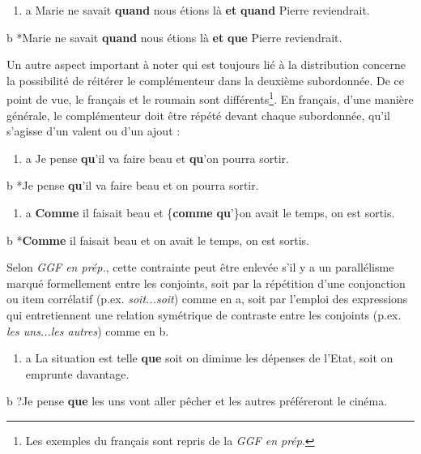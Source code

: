 \begin{enumerate}
\item \label{bkm:Ref270594898}a  Marie ne savait \textbf{quand} nous étions là \textbf{et} \textbf{quand} Pierre reviendrait.


\end{enumerate}
  b  *Marie ne savait \textbf{quand} nous étions là \textbf{et} \textbf{que} Pierre reviendrait. 

Un autre aspect important à noter qui est toujours lié à la distribution concerne la possibilité de réitérer le complémenteur dans la deuxième subordonnée. De ce point de vue, le français et le roumain sont différents\footnote{Les exemples du français sont repris de la \textit{GGF en prép}.}. En français, d'une manière générale, le complémenteur doit être répété devant chaque subordonnée, qu'il s'agisse d'un valent  ou d'un ajout  :


\begin{enumerate}
\item \label{bkm:Ref301357683}a  Je pense \textbf{qu}'il va faire beau et \textbf{qu}'on pourra sortir.


\end{enumerate}
  b  *Je pense \textbf{qu}'il va faire beau et on pourra sortir. 


\begin{enumerate}
\item \label{bkm:Ref301357699}a  \textbf{Comme} il faisait beau et \{\textbf{comme} {\textbar} \textbf{qu}'\}on avait le temps, on est sortis.


\end{enumerate}
  b  *\textbf{Comme} il faisait beau et on avait le temps, on est sortis. 

Selon \textit{GGF en prép.}, cette contrainte peut être enlevée s'il y a un parallélisme marqué formellement entre les conjoints, soit par la répétition d'une conjonction ou item corrélatif (p.ex. \textit{soit...soit}) comme en a, soit par l'emploi des expressions qui entretiennent une relation symétrique de contraste entre les conjoints (p.ex. \textit{les uns...les autres}) comme en b.


\begin{enumerate}
\item \label{bkm:Ref301357778}a  La situation est telle \textbf{que} soit on diminue les dépenses de l'Etat, soit on emprunte davantage.


\end{enumerate}
  b  ?Je pense \textbf{que} les uns vont aller pêcher et les autres préféreront le cinéma. 

